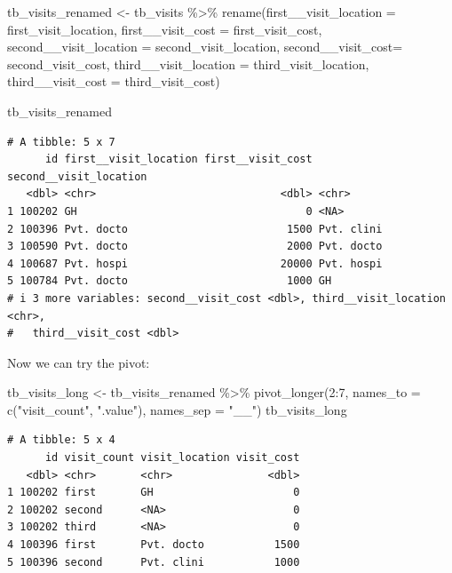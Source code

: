 \documentclass[
  letterpaper,
  DIV=11,
  numbers=noendperiod]{scrreprt}
\newenvironment{Shaded}{\begin{snugshade}}{\end{snugshade}}
\newcommand{\AttributeTok}[1]{\textcolor[rgb]{0.40,0.45,0.13}{#1}}
\newcommand{\DecValTok}[1]{\textcolor[rgb]{0.68,0.00,0.00}{#1}}
\newcommand{\FunctionTok}[1]{\textcolor[rgb]{0.28,0.35,0.67}{#1}}
\newcommand{\NormalTok}[1]{\textcolor[rgb]{0.00,0.23,0.31}{#1}}
\newcommand{\OtherTok}[1]{\textcolor[rgb]{0.00,0.23,0.31}{#1}}
\newcommand{\SpecialCharTok}[1]{\textcolor[rgb]{0.37,0.37,0.37}{#1}}
\newcommand{\StringTok}[1]{\textcolor[rgb]{0.13,0.47,0.30}{#1}}
\begin{document}
\begin{Shaded}
\begin{Highlighting}[]
\NormalTok{tb\_visits\_renamed }\OtherTok{\textless{}{-}} 
\NormalTok{  tb\_visits }\SpecialCharTok{\%\textgreater{}\%} 
  \FunctionTok{rename}\NormalTok{(}\AttributeTok{first\_\_visit\_location =}\NormalTok{ first\_visit\_location, }
         \AttributeTok{first\_\_visit\_cost =}\NormalTok{ first\_visit\_cost, }
         \AttributeTok{second\_\_visit\_location =}\NormalTok{ second\_visit\_location, }
         \AttributeTok{second\_\_visit\_cost=}\NormalTok{ second\_visit\_cost, }
         \AttributeTok{third\_\_visit\_location =}\NormalTok{ third\_visit\_location, }
         \AttributeTok{third\_\_visit\_cost =}\NormalTok{ third\_visit\_cost)}

\NormalTok{tb\_visits\_renamed}
\end{Highlighting}
\end{Shaded}

\begin{verbatim}
# A tibble: 5 x 7
      id first__visit_location first__visit_cost second__visit_location
   <dbl> <chr>                             <dbl> <chr>                 
1 100202 GH                                    0 <NA>                  
2 100396 Pvt. docto                         1500 Pvt. clini            
3 100590 Pvt. docto                         2000 Pvt. docto            
4 100687 Pvt. hospi                        20000 Pvt. hospi            
5 100784 Pvt. docto                         1000 GH                    
# i 3 more variables: second__visit_cost <dbl>, third__visit_location <chr>,
#   third__visit_cost <dbl>
\end{verbatim}

Now we can try the pivot:

\begin{Shaded}
\begin{Highlighting}[]
\NormalTok{tb\_visits\_long }\OtherTok{\textless{}{-}}
\NormalTok{  tb\_visits\_renamed }\SpecialCharTok{\%\textgreater{}\%} 
  \FunctionTok{pivot\_longer}\NormalTok{(}\DecValTok{2}\SpecialCharTok{:}\DecValTok{7}\NormalTok{, }
               \AttributeTok{names\_to =} \FunctionTok{c}\NormalTok{(}\StringTok{"visit\_count"}\NormalTok{, }\StringTok{".value"}\NormalTok{), }
               \AttributeTok{names\_sep =} \StringTok{"\_\_"}\NormalTok{)}
\NormalTok{tb\_visits\_long}
\end{Highlighting}
\end{Shaded}

\begin{verbatim}
# A tibble: 5 x 4
      id visit_count visit_location visit_cost
   <dbl> <chr>       <chr>               <dbl>
1 100202 first       GH                      0
2 100202 second      <NA>                    0
3 100202 third       <NA>                    0
4 100396 first       Pvt. docto           1500
5 100396 second      Pvt. clini           1000
\end{verbatim}
\end{document}
